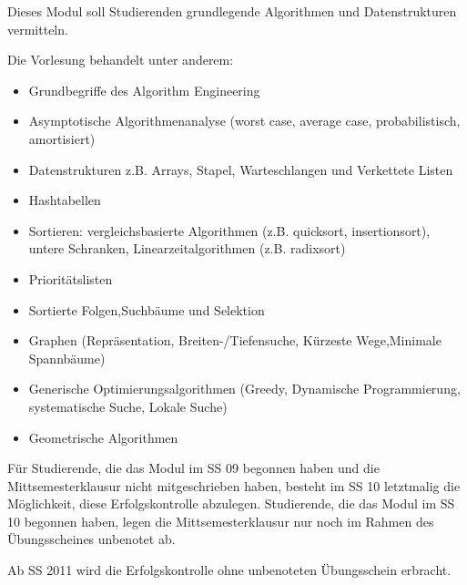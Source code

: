 \begin{module}
\begin{content}
Dieses Modul soll Studierenden grundlegende Algorithmen und Datenstrukturen vermitteln.

 

Die Vorlesung behandelt unter anderem:

 \begin{itemize}\item Grundbegriffe des Algorithm Engineering  \item Asymptotische Algorithmenanalyse (worst case, average case, probabilistisch, amortisiert)  \item Datenstrukturen z.B. Arrays, Stapel, Warteschlangen und Verkettete Listen  \item Hashtabellen  \item Sortieren: vergleichsbasierte Algorithmen (z.B. quicksort, insertionsort), untere Schranken, Linearzeitalgorithmen (z.B. radixsort)  \item Prioritätslisten  \item Sortierte Folgen,Suchbäume und Selektion  \item Graphen (Repräsentation, Breiten-/Tiefensuche, Kürzeste Wege,Minimale Spannbäume)  \item Generische Optimierungsalgorithmen (Greedy, Dynamische Programmierung, systematische Suche, Lokale Suche)  \item Geometrische Algorithmen  \end{itemize}
\end{content}

\begin{remarks}Für Studierende, die das Modul im SS 09 begonnen haben und die Mittsemesterklausur nicht mitgeschrieben haben, besteht im SS 10 letztmalig die Möglichkeit, diese Erfolgskontrolle abzulegen. Studierende, die das Modul im SS 10 begonnen haben, legen die Mittsemesterklausur nur noch im Rahmen des Übungsscheines unbenotet ab.

 

Ab SS 2011 wird die Erfolgskontrolle ohne unbenoteten Übungsschein erbracht.

\end{remarks}

\end{module}

